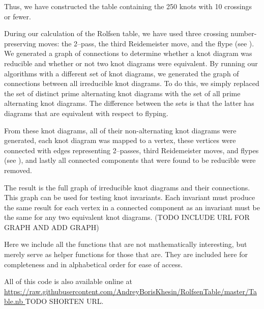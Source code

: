 \begin{paper}

Thus, we have constructed the table containing the 250 knots with 10 crossings
or fewer.



During our calculation of the Rolfsen table, we have used three crossing
number-preserving moves: the 2--pass, the third Reidemeister move, and the flype
(see \figMoves).
We generated a graph of connections to determine whether a knot diagram was
reducible and whether or not two knot diagrams were equivalent.
By running our algorithms with a different set of knot diagrams, we generated
the graph of connections between all irreducible knot diagrams.
To do this, we simply replaced the set of distinct prime alternating knot
diagrams with the set of all prime alternating knot diagrams.
The difference between the sets is that the latter has diagrams that are
equivalent with respect to flyping.

From these knot diagrams, all of their non-alternating knot diagrams were
generated, each knot diagram was mapped to a vertex, these vertices were
connected with edges representing 2--passes, third Reidemeister moves, and
flypes (see \figMoves), and lastly all connected components that were found to
be reducible were removed.


The result is the full graph of irreducible knot diagrams and their connections.
This graph can be used for testing knot invariants.
Each invariant must produce the same result for each vertex in a connected
component as an invariant must be the same for any two equivalent knot diagrams.
(TODO INCLUDE URL FOR GRAPH AND ADD GRAPH)


Here we include all the functions that are not mathematically interesting, but
merely serve as helper functions for those that are.
They are included here for completeness and in alphabetical order for ease of
access.

All of this code is also available online at \url{
https://raw.githubusercontent.com/AndreyBorisKhesin/RolfsenTable/master/Table.nb
} TODO SHORTEN URL.







\end{paper}
